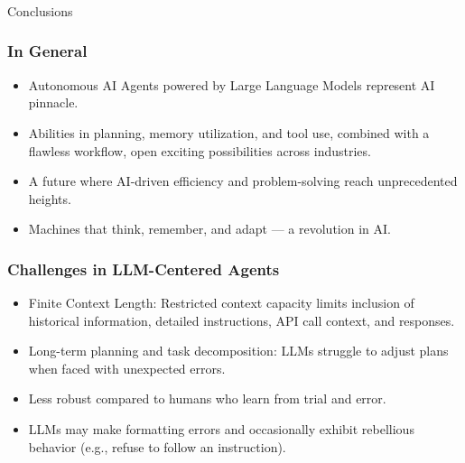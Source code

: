 \begin{frame}[fragile]\frametitle{}
\begin{center}
{\Large Conclusions}
\end{center}
\end{frame}

\begin{frame}[fragile]\frametitle{In General}
  \begin{itemize}
    \item Autonomous AI Agents powered by Large Language Models represent AI pinnacle.
    \item Abilities in planning, memory utilization, and tool use, combined with a flawless workflow, open exciting possibilities across industries.
    \item A future where AI-driven efficiency and problem-solving reach unprecedented heights.
    \item Machines that think, remember, and adapt — a revolution in AI.
  \end{itemize}
\end{frame}


\begin{frame}[fragile]\frametitle{Challenges in LLM-Centered Agents}
  \begin{itemize}

    \item Finite Context Length: Restricted context capacity limits inclusion of historical information, detailed instructions, API call context, and responses.
    \item Long-term planning and task decomposition: LLMs struggle to adjust plans when faced with unexpected errors.
    \item Less robust compared to humans who learn from trial and error.
    \item LLMs may make formatting errors and occasionally exhibit rebellious behavior (e.g., refuse to follow an instruction).
  \end{itemize}
\end{frame}




